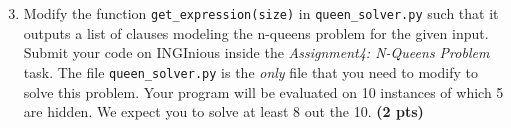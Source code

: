 \documentclass[11pt,a4paper]{report}
\begin{document}
\begin{answers}[10cm]
\end{answers}



\begin{enumerate}
\setcounter{enumi}{2}
\item Modify the function {\tt get\_expression(size)} in \texttt{queen\_solver.py} such that it outputs a list
of clauses modeling the n-queens problem for the given input. Submit your code on INGInious inside the \emph{Assignment4: N-Queens  Problem} task. The file \texttt{queen\_solver.py} is the \emph{only} file that you need to modify to solve this problem. Your program will be evaluated on 10 instances of which 5 are hidden. We expect you to solve at least 8 out the 10. \textbf{(2 pts)}
\end{enumerate}

\begin{answers}[5cm]
\end{answers}
\end{document}

